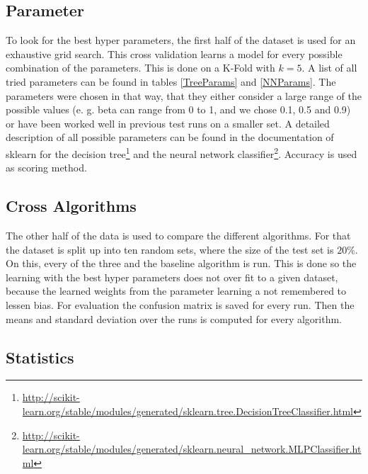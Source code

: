 \documentclass[a4paper,11pt]{article}
\begin{document}
\subsection{Parameter}

To look for the best hyper parameters, the first half of the dataset is used for an exhaustive grid search. This cross validation learns a model for every possible combination of the parameters. This is done on a K-Fold with $k=5$. A list of all tried parameters can be found in tables \ref{TreeParams} and \ref{NNParams}. The parameters were chosen in that way, that they either consider a large range of the possible values (e. g. beta can range from 0 to 1, and we chose 0.1, 0.5 and 0.9) or have been worked well in previous test runs on a smaller set.
A detailed description of all possible parameters can be found in the documentation of sklearn for the decision tree\footnote{\url{http://scikit-learn.org/stable/modules/generated/sklearn.tree.DecisionTreeClassifier.html}} and the neural network classifier\footnote{\url{http://scikit-learn.org/stable/modules/generated/sklearn.neural_network.MLPClassifier.html}}. 
Accuracy is used as scoring method. 



\subsection{Cross Algorithms}

The other half of the data is used to compare the different algorithms. For that the dataset is split up into ten random sets, where the size of the test set is $20\%$. On this, every of the three and the baseline algorithm is run. This is done so the learning with the best hyper parameters does not over fit to a given dataset, because the learned weights from the parameter learning a not remembered to lessen bias. For evaluation the confusion matrix is saved for every run. Then the means and standard deviation over the runs is computed for every algorithm.


\subsection{Statistics}
\end{document}
